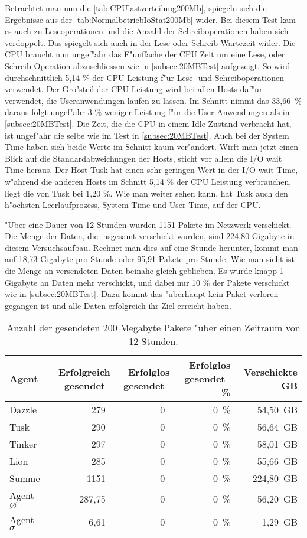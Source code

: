 Betrachtet man nun die \cref{tab:CPUlastverteilung200Mb}, spiegeln sich die Ergebnisse aus der \cref{tab:NormalbetriebIoStat200Mb} wider. %
Bei diesem Test kam es auch zu Leseoperationen und die Anzahl der Schreiboperationen haben sich verdoppelt. %
Das spiegelt sich auch in der Lese-oder Schreib Wartezeit wider. Die CPU braucht nun ungef"ahr das F"unffache der CPU Zeit %
um eine Lese, oder Schreib Operation abzuschliessen wie in \cref{subsec:20MBTest} aufgezeigt. %
So wird durchschnittlich 5,14 \% der CPU Leistung f"ur Lese- und Schreiboperationen verwendet. Der Gro"steil der CPU Leistung wird %
bei allen Hosts daf"ur verwendet, die Useranwendungen laufen zu lassen. Im Schnitt nimmt das \mbox{33,66 \%} daraus folgt ungef"ahr %
3 \% weniger Leistung f"ur die User Anwendungen als in \cref{subsec:20MBTest}. Die Zeit, die die CPU in einem Idle Zustand verbracht %
hat, ist ungef"ahr die selbe wie im Test in \cref{subsec:20MBTest}. Auch bei der System Time haben sich beide Werte im Schnitt kaum ver"andert. 
Wirft man jetzt einen Blick auf die Standardabweichungen der Hosts, sticht vor allem die I/O wait Time %
heraus. Der Host Tusk hat einen sehr geringen Wert in der I/O wait Time, w"ahrend die anderen Hosts im Schnitt 5,14 \% der CPU Leistung verbrauchen, %
liegt die von Tusk bei 1,20 \%. Wie man weiter sehen kann, hat Tusk auch den h"ochsten Leerlaufprozess, System Time und User Time, auf der CPU. %

"Uber eine Dauer von 12 Stunden wurden 1151 Pakete im Netzwerk verschickt. Die Menge der Daten, die insgesamt verschickt wurden, sind 224,80 Gigabyte in diesem Versuchsaufbau. %
Rechnet man dies auf eine Stunde herunter, kommt man auf 18,73 Gigabyte pro Stunde oder 95,91 Pakete pro Stunde. Wie man sieht ist die Menge an versendeten %
Daten beinahe gleich geblieben. Es wurde knapp 1 Gigabyte an Daten mehr verschickt, und dabei nur 10 \% der Pakete verschickt wie in \cref{subsec:20MBTest}. %
Dazu kommt das "uberhaupt kein Paket verloren gegangen ist und alle Daten erfolgreich ihr Ziel erreicht haben. 

\begin{table}
\centering
\begin{tabular}{l%
 r<{\,}%
 r<{\,}%
 r<{\,\%}%
 r<{\,GB}%
}
Agent  				& Erfolgreich gesendet			& Erfolglos gesendet			& Erfolglos gesendet	& Verschickte	\\
\hline
Dazzle 				& 279			 		& 0					& 0			& 54,50			\\
Tusk 				& 290					& 0					& 0			& 56,64			\\
Tinker				& 297					& 0					& 0			& 58,01			\\
Lion				& 285					& 0					& 0			& 55,66			\\ 
Summe				& 1151					& 0					& 0 			& 224,80		\\
Agent $\diameter $  		& 287,75				& 0				 	& 0			& 56,20 		\\   
Agent $\sigma $			& 6,61		 			& 0					& 0      		& 1,29		\\
\end{tabular}
\caption{Anzahl der gesendeten 200 Megabyte Pakete "uber einen Zeitraum von 12 Stunden.}
\label{tab:VerschickteDaten200Mb}
\end{table}


